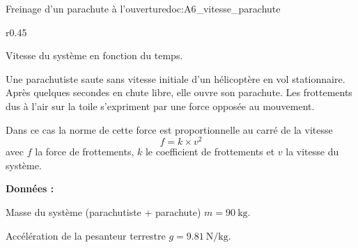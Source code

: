 

\newpage
{}

\begin{doc}{Freinage d'un parachute à l'ouverture}{doc:A6_vitesse_parachute}
  \begin{wrapfigure}{r}{0.45\linewidth}
    \vspace*{-24pt}
    \begin{center}
      \small{
        Vitesse du système en fonction du temps.
      }
    \end{center}
  \end{wrapfigure}
  
  Une parachutiste saute sans vitesse initiale d'un hélicoptère en vol stationnaire.
  Après quelques secondes en chute libre, elle ouvre son parachute.
  Les frottements dus à l'air sur la toile s'expriment par une force opposée au mouvement. 
  
  Dans ce cas la norme de cette force est proportionnelle au carré de la vitesse
  \begin{equation*}
    f = k \times v^2
  \end{equation*}
  avec $f$ la force de frottements, $k$ le coefficient de frottements et $v$ la vitesse du système.

  \textbf{Données :}
  \begin{listePoints}
    \item Masse du système (parachutiste + parachute) $m = \qty{90}{\kg}$.
  \end{listePoints}
  \vAligne{-34pt}
  
  \begin{listePoints}
    \item Accélération de la pesanteur terrestre $g = \qty{9,81}{\newton \per\kg}$.
  \end{listePoints}
\end{doc}





